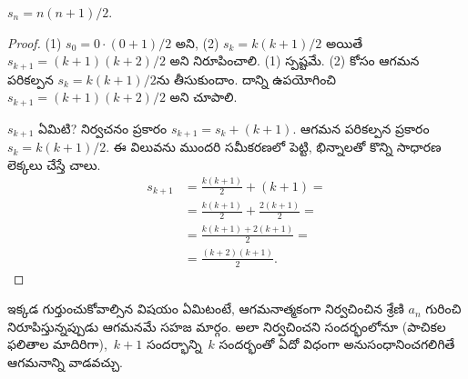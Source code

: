 \documentclass[../../../include/open-logic-section]{subfiles}
\begin{document}
\begin{prop}
  $s_n = n(n+1)/2$.
\end{prop}

\begin{proof}
  (1) $s_0 = 0\cdot(0 + 1)/2$ అని, (2) $s_k =
  k(k+1)/2$ అయితే $s_{k+1} = (k+1)(k+2)/2$ అని నిరూపించాలి. (1) స్పష్టమే. (2) కోసం ఆగమన పరికల్పన $s_k = k(k+1)/2$ను తీసుకుందాం. దాన్ని ఉపయోగించి $s_{k+1} = (k+1)(k+2)/2$ అని చూపాలి.

  $s_{k+1}$ ఏమిటి? నిర్వచనం ప్రకారం $s_{k+1} = s_k + (k+1)$. ఆగమన పరికల్పన ప్రకారం $s_k = k(k+1)/2$. ఈ విలువను ముందరి సమీకరణలో పెట్టి, భిన్నాలతో కొన్ని సాధారణ లెక్కలు చేస్తే చాలు.
  \begin{align*}
    s_{k+1} & = \frac{k(k+1)}{2} + (k+1) = {}\\
    & = \frac{k(k+1)}{2} + \frac{2(k+1)}{2} = {}\\
    & = \frac{k(k+1) + 2(k+1)}{2} = {}\\
    & = \frac{(k+2)(k+1)}{2}.
  \end{align*}
\end{proof}

ఇక్కడ గుర్తుంచుకోవాల్సిన విషయం ఏమిటంటే, ఆగమనాత్మకంగా నిర్వచించిన శ్రేణి $a_n$ గురించి నిరూపిస్తున్నప్పుడు ఆగమనమే సహజ మార్గం. అలా నిర్వచించని సందర్భంలోనూ (పాచికల ఫలితాల మాదిరిగా),~$k+1$ సందర్భాన్ని~$k$ సందర్భంతో ఏదో విధంగా అనుసంధానించగలిగితే ఆగమనాన్ని వాడవచ్చు.
\end{document}
